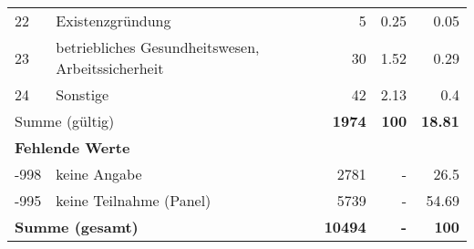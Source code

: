 \begin{longtable}{lXrrr}
        22 & \multicolumn{1}{X}{Existenzgründung} & %
          \num{5} &
          \num[round-mode=places,round-precision=2]{0,25} &
          \num[round-mode=places,round-precision=2]{0,05} \\

        23 & \multicolumn{1}{X}{betriebliches Gesundheitswesen, Arbeitssicherheit} & %
          \num{30} &
          \num[round-mode=places,round-precision=2]{1,52} &
          \num[round-mode=places,round-precision=2]{0,29} \\

        24 & \multicolumn{1}{X}{Sonstige} & %
          \num{42} &
          \num[round-mode=places,round-precision=2]{2,13} &
          \num[round-mode=places,round-precision=2]{0,4} \\

     \midrule
     \multicolumn{2}{l}{Summe (gültig)} &
       \textbf{\num{1974}} &
     \textbf{100} &
       \textbf{\num[round-mode=places,round-precision=2]{18,81}} \\
     \multicolumn{5}{l}{\textbf{Fehlende Werte}}\\
       -998 &
       keine Angabe &
         \num{2781} &
        - &
         \num[round-mode=places,round-precision=2]{26,5} \\
       -995 &
       keine Teilnahme (Panel) &
         \num{5739} &
        - &
         \num[round-mode=places,round-precision=2]{54,69} \\
     \midrule
     \multicolumn{2}{l}{\textbf{Summe (gesamt)}} &
          \textbf{\num{10494}} &
        \textbf{-} &
        \textbf{100} \\
     \bottomrule
     \end{longtable}
     
